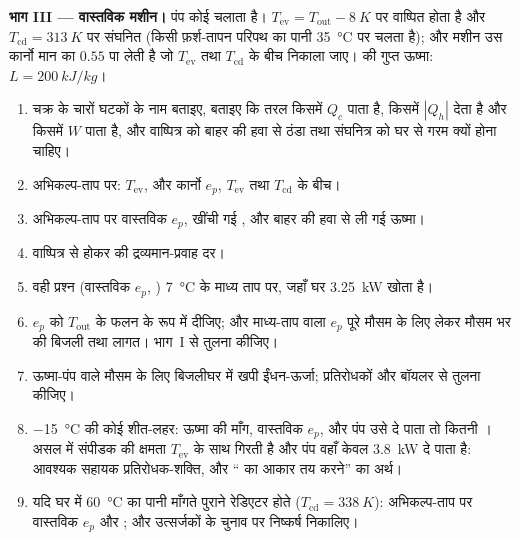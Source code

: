\begin{problem}
\medskip
\noindent\textbf{भाग III --- वास्तविक मशीन।}
पंप कोई  चलाता है। 
$T_{\mathrm{ev}} = T_{\mathrm{out}} - \qty{8}{K}$ पर वाष्पित होता है और
$T_{\mathrm{cd}} = \qty{313}{K}$ पर संघनित (किसी फ़र्श-तापन परिपथ का पानी
\qty{35}{\degreeCelsius} पर चलता है); और मशीन उस कार्नो मान का $0.55$ पा
लेती है जो $T_{\mathrm{ev}}$ तथा $T_{\mathrm{cd}}$ के बीच निकाला जाए।  की
गुप्त ऊष्मा: $L = \qty{200}{kJ/kg}$।
\begin{enumerate}[resume]
  \item चक्र के चारों घटकों के नाम बताइए, बताइए कि तरल किसमें $Q_c$ पाता
        है, किसमें $|Q_h|$ देता है और किसमें $W$ पाता है, और वाष्पित्र को
        बाहर की हवा से ठंडा तथा संघनित्र को घर से गरम क्यों होना चाहिए।
  \item अभिकल्प-ताप पर: $T_{\mathrm{ev}}$, और कार्नो $e_p$,
        $T_{\mathrm{ev}}$ तथा $T_{\mathrm{cd}}$ के बीच।
  \item अभिकल्प-ताप पर वास्तविक $e_p$, खींची गई , और बाहर की
        हवा से ली गई ऊष्मा।
  \item वाष्पित्र से होकर  की द्रव्यमान-प्रवाह दर।
  \item वही प्रश्न (वास्तविक $e_p$, ) \qty{7}{\degreeCelsius}
        के माध्य ताप पर, जहाँ घर \qty{3.25}{kW} खोता है।
  \item $e_p$ को $T_{\mathrm{out}}$ के फलन के रूप में दीजिए; और माध्य-ताप
        वाला $e_p$ पूरे मौसम के लिए लेकर मौसम भर की बिजली तथा लागत।
        भाग~I से तुलना कीजिए।
  \item ऊष्मा-पंप वाले मौसम के लिए बिजलीघर में खपी ईंधन-ऊर्जा; प्रतिरोधकों
        और बॉयलर से तुलना कीजिए।
  \item \qty{-15}{\degreeCelsius} की कोई शीत-लहर: ऊष्मा की माँग, वास्तविक
        $e_p$, और पंप उसे दे पाता तो कितनी । असल में संपीडक
        की क्षमता $T_{\mathrm{ev}}$ के साथ गिरती है और पंप वहाँ केवल
        \qty{3.8}{kW} दे पाता है: आवश्यक सहायक प्रतिरोधक-शक्ति, और `` का आकार तय करने'' का अर्थ।
  \item यदि घर में \qty{60}{\degreeCelsius} का पानी माँगते पुराने रेडिएटर
        होते ($T_{\mathrm{cd}} = \qty{338}{K}$): अभिकल्प-ताप पर वास्तविक
        $e_p$ और ; और उत्सर्जकों के चुनाव पर निष्कर्ष
        निकालिए।
\end{enumerate}


\end{problem}
